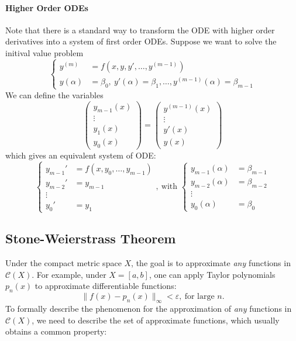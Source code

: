 \paragraph{Higher Order ODEs}
Note that there is a standard way to transform the ODE with higher order derivatives into a system of first order ODEs. Suppose we want to solve the initival value problem
\[
\left\{
\begin{aligned}
y^{(m)}&=f(x,y,y',\dots,y^{(m-1)})\\
y(\alpha)&=\beta_0,\ y'(\alpha)=\beta_1,\dots,y^{(m-1)}(\alpha)=\beta_{m-1}
\end{aligned}
\right.
\]
We can define the variables
\[
\begin{pmatrix}
y_{m-1}(x)\\\vdots\\y_1(x)\\y_0(x)
\end{pmatrix}=\begin{pmatrix}
y^{(m-1)}(x)\\\vdots\\y'(x)\\y(x)
\end{pmatrix}
\]
which gives an equivalent system of ODE:
\[
\left\{
\begin{aligned}
y_{m-1}'&=f(x,y_0,\dots,y_{m-1})\\
y_{m-2}'&=y_{m-1}\\
\vdots\\
y_0' &= y_1
\end{aligned}\right.,\ \text{with }
\left\{
\begin{aligned}
y_{m-1}(\alpha)&=\beta_{m-1}\\
y_{m-2}(\alpha)&=\beta_{m-2}\\
\vdots\\
y_0(\alpha) &= \beta_0
\end{aligned}
\right.
\]

\subsection{Stone-Weierstrass Theorem}
Under the compact metric space $X$, the goal is to approximate \emph{any} functions in $\mathcal{C}(X)$. For example, under $X=[a,b]$, one can apply Taylor polynomials $p_n(x)$ to approximate differentiable functions:
\[
\|f(x) - p_n(x)\|_\infty<\varepsilon,\ \text{for large $n$}.
\]
To formally describe the phenomenon for the approximation of \emph{any} functions in $\mathcal{C}(X)$, we need to describe the set of approximate functions, which usually obtains a common property:

